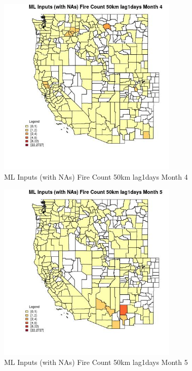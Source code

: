 \begin{figure} 
\centering  
\includegraphics[width=0.77\textwidth]{Code_Outputs/Report_ML_input_PM25_Step4_part_f_de_duplicated_aveswNAs_CountyFire_Count_50km_lag1daysmedianMonth4.jpg} 
\caption{\label{fig:Report_ML_input_PM25_Step4_part_f_de_duplicated_aveswNAsCountyFire_Count_50km_lag1daysmedianMonth4}ML Inputs (with NAs) Fire Count 50km lag1days Month 4} 
\end{figure} 
 

\begin{figure} 
\centering  
\includegraphics[width=0.77\textwidth]{Code_Outputs/Report_ML_input_PM25_Step4_part_f_de_duplicated_aveswNAs_CountyFire_Count_50km_lag1daysmedianMonth5.jpg} 
\caption{\label{fig:Report_ML_input_PM25_Step4_part_f_de_duplicated_aveswNAsCountyFire_Count_50km_lag1daysmedianMonth5}ML Inputs (with NAs) Fire Count 50km lag1days Month 5} 
\end{figure} 
 

